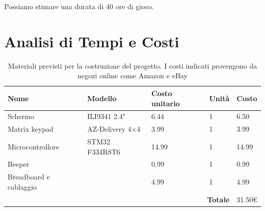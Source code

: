 \documentclass[a4paper]{article}
\begin{document}
Possiamo stimare una durata di 40 ore di gioco.

\section{Analisi di Tempi e Costi}

\begin{center}
	\begin{table}[ht]
		\centering
		\begin{tabular}{|llll|l|}
			\hline
			\multicolumn{1}{|l|}{\textbf{Nome}}                   & \multicolumn{1}{l|}{\textbf{Modello}}       & \multicolumn{1}{l|}{\textbf{Costo unitario}} & \textbf{Unità} & \textbf{Costo} \\ \hline
			\multicolumn{1}{|l|}{Schermo}                & \multicolumn{1}{l|}{ILI9341 2.4"}           & \multicolumn{1}{l|}{6.44}                    & 1               & 6.50           \\ \hline
			\multicolumn{1}{|l|}{Matrix keypad}          & \multicolumn{1}{l|}{AZ-Delivery 4$\times$4}        & \multicolumn{1}{l|}{3.99}                    & 1               & 3.99           \\ \hline
			\multicolumn{1}{|l|}{Microcontrollore}       & \multicolumn{1}{l|}{STM32 F334R8T6}         & \multicolumn{1}{l|}{14.99}                   & 1               & 14.99          \\ \hline
			\multicolumn{1}{|l|}{Beeper}                 & \multicolumn{1}{l|}{}                       & \multicolumn{1}{l|}{0.99}                    & 1               & 0.99           \\ \hline
			\multicolumn{1}{|l|}{Breadboard e cablaggio} & \multicolumn{1}{l|}{}                       & \multicolumn{1}{l|}{4.99}                    & 1               & 4.99           \\ \hline
			\multicolumn{4}{|r|}{\textbf{Totale}}                                                                                                            & 31.50\euro        \\ \hline
		\end{tabular}
		\caption{
			Materiali previsti per la costruzione del progetto. I costi indicati
			provengono da negozi online come Amazon e eBay
		}
	\end{table}
\end{center}
\end{document}
